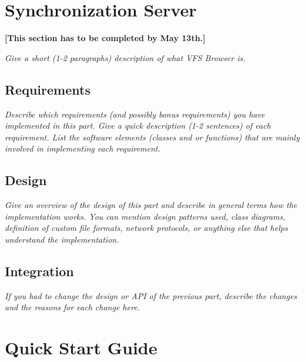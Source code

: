 \documentclass[a4paper,12pt]{article}
\begin{document}

\section{Synchronization Server}

\textbf{[This section has to be completed by May 13th.]}

\emph{Give a short (1-2 paragraphs) description of what VFS Browser is.}


\subsection{Requirements}

\emph{Describe which requirements (and possibly bonus requirements) you have implemented in this part. Give a quick description (1-2 sentences) of each requirement. List the software elements (classes and or functions) that are mainly involved in implementing each requirement.}


\subsection{Design}

\emph{Give an overview of the design of this part and describe in general terms how the implementation works. You can mention design patterns used, class diagrams, definition of custom file formats, network protocols, or anything else that helps understand the implementation.}


\subsection{Integration}

\emph{If you had to change the design or API of the previous part, describe the changes and the reasons for each change here.}




\section{Quick Start Guide}
\end{document}
